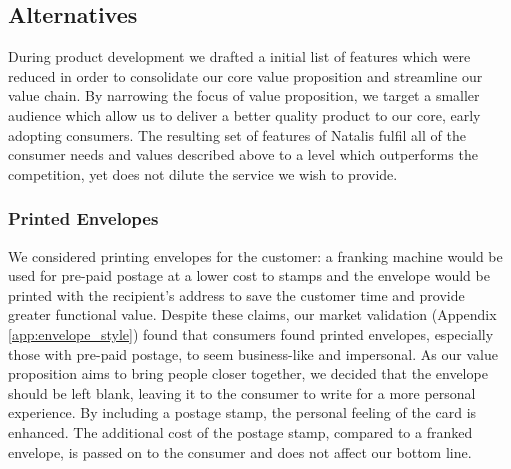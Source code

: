 \documentclass[10pt,a4paper]{article}
\begin{document}
\subsection*{Alternatives}
During product development we drafted a initial list of features which were reduced in order to consolidate our core value proposition and streamline our value chain. By narrowing the focus of value proposition, we target a smaller audience which allow us to deliver a better quality product to our core, early adopting consumers. The resulting set of features of Natalis fulfil all of the consumer needs and values described above to a level which outperforms the competition, yet does not dilute the service we wish to provide.

\subsubsection*{Printed Envelopes}
We considered printing envelopes for the customer: a franking machine would be used for pre-paid postage at a lower cost to stamps and the envelope would be printed with the recipient's address to save the customer time and provide greater functional value. Despite these claims, our market validation (Appendix \ref{app:envelope_style}) found that consumers found printed envelopes, especially those with pre-paid postage, to seem business-like and impersonal. As our value proposition aims to bring people closer together, we decided that the envelope should be left blank, leaving it to the consumer to write for a more personal experience. By including a postage stamp, the personal feeling of the card is enhanced. The additional cost of the postage stamp, compared to a franked envelope, is passed on to the consumer and does not affect our bottom line.
\end{document}
